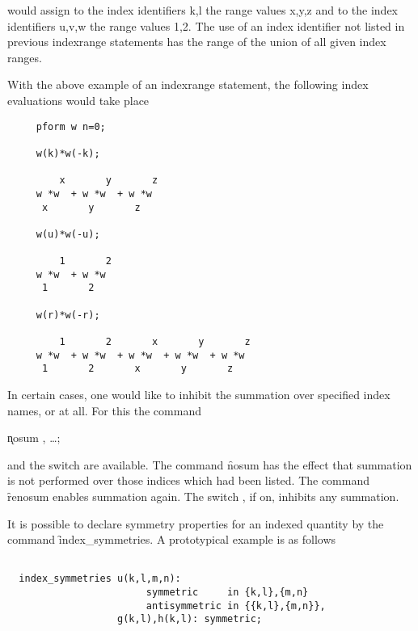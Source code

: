would assign to the index identifiers k,l the range values x,y,z and
to the index identifiers u,v,w the range values 1,2. The use of an
index identifier not listed in previous indexrange statements has the
range of the union of all given index ranges.

With the above example of an indexrange statement, the following
index evaluations would take place

\begin{verbatim}
     pform w n=0;

     w(k)*w(-k);

         x       y       z
     w *w  + w *w  + w *w
      x       y       z

     w(u)*w(-u);

         1       2
     w *w  + w *w
      1       2

     w(r)*w(-r);

         1       2       x       y       z
     w *w  + w *w  + w *w  + w *w  + w *w
      1       2       x       y       z
\end{verbatim}

In certain cases, one would like to inhibit the summation over
specified index names, or at all.  For this the command

\hypertarget{command:NOSUM}{}
\hspace*{2em} \k{nosum} , \ldots;\label{NOSUM}

and the switch  are
\hypertarget{command:RENOSUM}{}
\hypertarget{switch:NOSUM}{}
available.  The command \f{nosum} has the effect that summation is
not performed over those indices which had been listed.  The command
\f{renosum}\label{RENOSUM} enables summation again.  The switch ,
if on, inhibits any summation. 

\label{INDEXSYMMETRIES} 
\hypertarget{command:INDEX_SYMMETRIES}{}
It is possible to declare symmetry properties for an indexed quantity by
the command \f{index\_symmetries}. A prototypical example is as
follows

\begin{verbatim}

  index_symmetries u(k,l,m,n):
                        symmetric     in {k,l},{m,n}
                        antisymmetric in {{k,l},{m,n}},
                   g(k,l),h(k,l): symmetric;

\end{verbatim}

